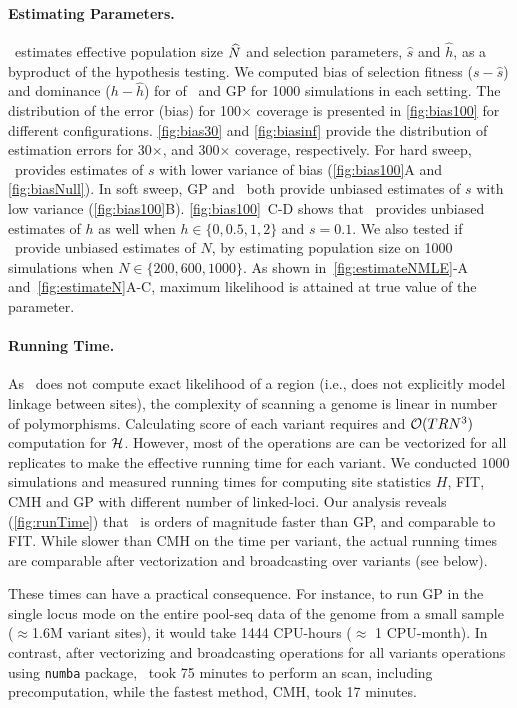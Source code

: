 \paragraph{Estimating Parameters.}
\comale\ estimates effective population size $\widehat{N}$ and selection
parameters, $\hat{s}$ and $\hat{h}$, as a byproduct of the hypothesis
testing. We computed bias of selection fitness ($s-\hat{s}$) and
dominance ($h-\hat{h}$) for of \comale\ and GP for 1000 simulations in
each setting. The distribution of the error (bias) for 100$\times$
coverage is presented in \ref{fig:bias100} for different
configurations.  \ref{fig:bias30} and \ref{fig:biasinf} provide the
distribution of estimation errors for 30$\times$, and 300$\times$
coverage, respectively.  For hard sweep, \comale\ provides estimates
of $s$ with lower variance of bias (\ref{fig:bias100}A and
\ref{fig:biasNull}). In soft sweep, GP and \comale\ both provide unbiased
estimates of $s$ with low variance
(\ref{fig:bias100}B). \ref{fig:bias100}~C-D shows that \comale\
provides unbiased estimates of $h$ as well when $h\in\{0,0.5,1,2\}$
and $s=0.1$.  We also tested if \comale\ provide unbiased estimates of
$N$, by estimating population size on 1000 simulations when $N\in
\{200,600,1000\}$. As shown in~\ref{fig:estimateNMLE}-A 
and~\ref{fig:estimateN}A-C, maximum
likelihood is attained at true value of the parameter.

\paragraph{Running Time.}
As \comale\ does not compute exact likelihood of a region (i.e., does
not explicitly model linkage between sites), the complexity of
scanning a genome is linear in number of polymorphisms.  Calculating
score of each variant requires and ${\cal O}(TRN^3)$ computation
for ${\cal H}$. However, most of the operations
are can be vectorized for all replicates to make the effective running
time for each variant.  We
conducted $1000$ simulations and measured running times for computing site 
statistics $H$, FIT, CMH and GP with different number of linked-loci.  Our
analysis reveals (\ref{fig:runTime}) that \comale\ is orders of
magnitude faster than GP, and comparable to FIT. While slower than CMH
on the time per variant, the actual running times are comparable after
vectorization and broadcasting over variants (see below).

These times can have a practical consequence. For instance, to run GP
in the single locus mode on the entire pool-seq data of the \dmel genome from a
small sample ($\approx$1.6M variant sites), it would take 1444 CPU-hours
($\approx$ 1 CPU-month). In contrast, after vectorizing and
broadcasting operations for all variants operations using
\texttt{numba} package, \comale\ took 75 minutes to perform an
scan, including precomputation, while the fastest method, CMH, took 17 minutes.


